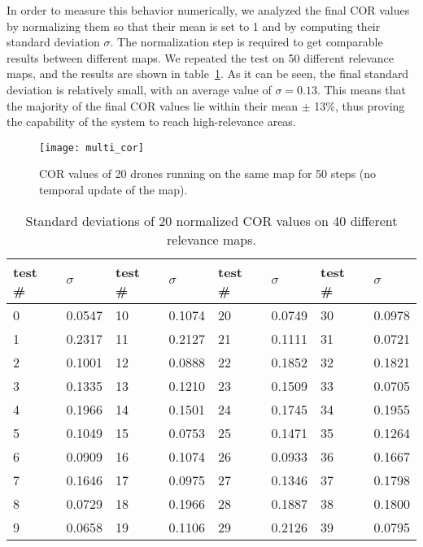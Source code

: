 \documentclass{article}
\begin{document}
 In order to measure this behavior numerically, we analyzed the final COR values by normalizing them so that their mean is set to 1 and by computing their standard deviation $\sigma$. The normalization step is required to get comparable results between different maps. We repeated the test on 50 different relevance maps, and the results are shown in table~\ref{tab:multi_cor}. As it can be seen, the final standard deviation is relatively small, with an average value of $\sigma=0.13$. This means that the majority of the final COR values lie within their mean $\pm$ 13\%, thus proving the  capability of the system to reach high-relevance areas.
\begin{figure}
	\centering
	\texttt{[image: multi\_cor]}
	\caption{COR values of 20 drones running on the same map for 50 steps (no temporal update of the map).}
	\label{fig:multi_cor}
\end{figure}

\begin{table}[]
	\centering
	\caption{Standard deviations of 20 normalized COR values on 40 different relevance maps.}
	\label{tab:multi_cor}{
	\begin{tabular}{ll|ll|ll|ll}
	\toprule
	test \# & $\sigma$ & test \# & $\sigma$ & test \#& $\sigma$ & test \# & $\sigma$ \\ \midrule
0 & 0.0547 & 10 & 0.1074 & 20 & 0.0749 & 30 & 0.0978 \\
1 & 0.2317 & 11 & 0.2127 & 21 & 0.1111 & 31 & 0.0721 \\
2 & 0.1001 & 12 & 0.0888 & 22 & 0.1852 & 32 & 0.1821 \\
3 & 0.1335 & 13 & 0.1210 & 23 & 0.1509 & 33 & 0.0705 \\
4 & 0.1966 & 14 & 0.1501 & 24 & 0.1745 & 34 & 0.1955 \\
5 & 0.1049 & 15 & 0.0753 & 25 & 0.1471 & 35 & 0.1264 \\
6 & 0.0909 & 16 & 0.1074 & 26 & 0.0933 & 36 & 0.1667 \\
7 & 0.1646 & 17 & 0.0975 & 27 & 0.1346 & 37 & 0.1798 \\
8 & 0.0729 & 18 & 0.1966 & 28 & 0.1887 & 38 & 0.1800 \\
9 & 0.0658 & 19 & 0.1106 & 29 & 0.2126 & 39 & 0.0795 \\ %
\end{tabular}}{}
\end{table}
\end{document}

